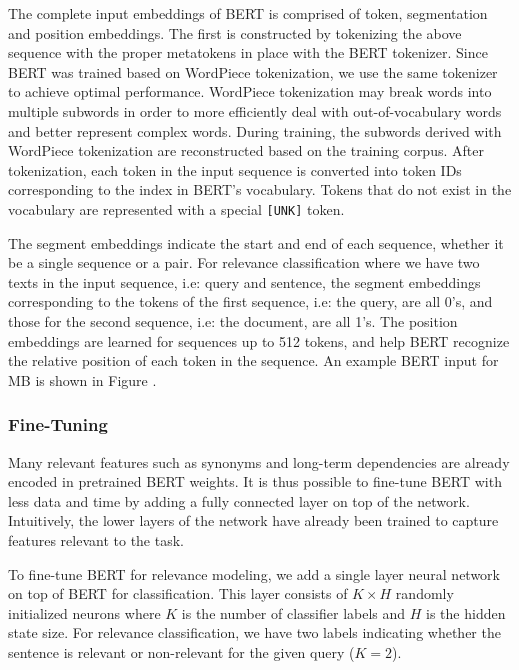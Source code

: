 The complete input embeddings of BERT is comprised of token, segmentation and position embeddings.
The first is constructed by tokenizing the above sequence with the proper metatokens in place with the BERT tokenizer.
Since BERT was trained based on WordPiece tokenization, we use the same tokenizer to achieve optimal performance.
WordPiece tokenization may break words into multiple subwords in order to more efficiently deal with out-of-vocabulary words and better represent complex words.
During training, the subwords derived with WordPiece tokenization are reconstructed based on the training corpus.
After tokenization, each token in the input sequence is converted into token IDs corresponding to the index in BERT's vocabulary.
Tokens that do not exist in the vocabulary are represented with a special \texttt{[UNK]} token.

The segment embeddings indicate the start and end of each sequence, whether it be a single sequence or a pair.
For relevance classification where we have two texts in the input sequence, i.e: query and sentence, the segment embeddings corresponding to the tokens of the first sequence, i.e: the query, are all 0's, and those for the second sequence, i.e: the document, are all 1's.
The position embeddings are learned for sequences up to 512 tokens, and help BERT recognize the relative position of each token in the sequence.
An example BERT input for MB is shown in Figure .

\subsubsection{Fine-Tuning}

Many relevant features such as synonyms and long-term dependencies are already encoded in pretrained BERT weights.
It is thus possible to fine-tune BERT with less data and time by adding a fully connected layer on top of the network.
Intuitively, the lower layers of the network have already been trained to capture features relevant to the task.

To fine-tune BERT for relevance modeling, we add a single layer neural network on top of BERT for classification.
This layer consists of $ K \times H $ randomly initialized neurons where $ K $ is the number of classifier labels and $ H$ is the hidden state size.
For relevance classification, we have two labels indicating whether the sentence is relevant or non-relevant for the given query ($ K = 2 $).

